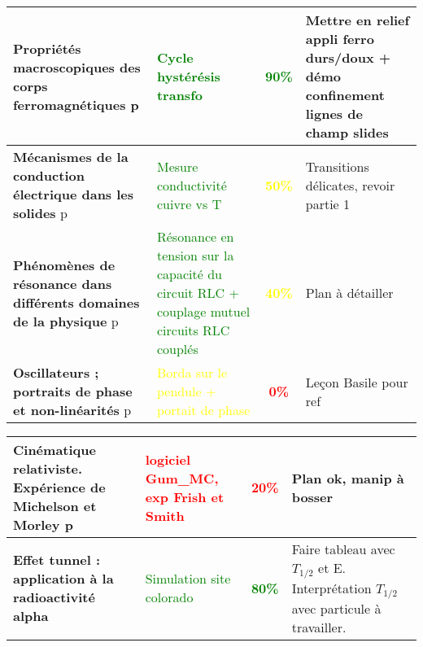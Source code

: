 \begin{changemargin}{-1.5cm}{-0cm}
\begin{center}
\begin{tabularx}{\paperwidth-2cm}{| X | X | c | X |}
  \hline
  \hline
  \textbf{Propriétés macroscopiques des corps ferromagnétiques } p\pageref{LP_Ferromagnetisme} & \textcolor{green}{Cycle hystérésis transfo} & \textcolor{green}{\textbf{90\%}} & Mettre en relief appli ferro durs/doux + démo confinement lignes de champ slides \\
  \hline
  \textbf{Mécanismes de la conduction électrique dans les solides} p\pageref{LP_Conduction} & \textcolor{green}{Mesure conductivité cuivre vs T} & \textcolor{yellow}{\textbf{50\%}} & Transitions délicates, revoir partie 1 \\
  \hline
  \textbf{Phénomènes de résonance dans différents domaines de la physique} p\pageref{LP_resonance} & \textcolor{green}{Résonance en tension sur la capacité du circuit RLC + couplage mutuel circuits RLC couplés} & \textcolor{yellow}{\textbf{40\%}} & Plan à détailler  \\
  \hline
  \textbf{Oscillateurs ; portraits de phase et non-linéarités} p\pageref{LP_PortaitPhase}~& \textcolor{yellow}{Borda sur le pendule + portait de phase} & \textcolor{red}{\textbf{0\%}} & Leçon Basile pour ref  \\
  \hline
\end{tabularx}
\end{center}

\begin{center}
\begin{tabularx}{\paperwidth-2cm}{| X | X | c | X |}
\hline
  \textbf{Cinématique relativiste. Expérience de Michelson et Morley} p\pageref{LP_CinematiqueRelativiste} & \textcolor{red}{logiciel Gum\_MC, exp Frish et Smith} & \textcolor{red}{\textbf{20\%}} & Plan ok, manip à bosser  \\
  \hline
  \textbf{Effet tunnel : application à la radioactivité alpha} & \textcolor{green}{Simulation site colorado} & \textcolor{green}{\textbf{80\%}} & Faire tableau avec $T_{1/2}$ et E. Interprétation $T_{1/2}$ avec particule à travailler. \\
  \hline

\end{tabularx}
\end{center}

\end{changemargin}